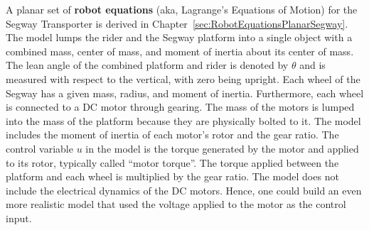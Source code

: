 A planar set of \textbf{robot equations} (aka, Lagrange's Equations of Motion) for the Segway Transporter is derived in Chapter~\ref{sec:RobotEquationsPlanarSegway}. The model lumps the rider and the Segway platform into a single object with a combined mass, center of mass, and moment of inertia about its center of mass. The lean angle of the combined platform and rider is denoted by $\theta$ and is measured with respect to the vertical, with zero being upright. Each wheel of the Segway has a given mass, radius, and moment of inertia. Furthermore, each wheel is connected to a DC motor through gearing. The mass of the motors is lumped into the mass of the platform because they are physically bolted to it. The model includes the moment of inertia of each motor's rotor and the gear ratio. The control variable $u$ in the model is the torque generated by the motor and applied to its rotor, typically called ``motor torque''. The torque applied between the platform and each wheel is multiplied by the gear ratio. The model does not include the electrical dynamics of the DC motors. Hence, one could build an even more realistic model that used the voltage applied to the motor as the control input.

 \vspace*{.2cm}
\begin{center}
\setlength{\fboxrule}{2pt}  %
\end{center}
  \vspace*{.2cm}

